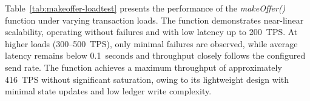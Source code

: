 \documentclass[12pt]{article}
\begin{document}
	\begin{table}[h]
		\centering
		\caption{Performance Results for \texttt{acceptOffer} (Payload: 35 bytes) under Varying Load}
		
		
		\label{tab:acceptoffer-loadtest}
	\end{table}
	
	
	Table~\ref{tab:makeoffer-loadtest} presents the performance of the \textit{makeOffer()} function under varying transaction loads. The function demonstrates near-linear scalability, operating without failures and with low latency up to 200~TPS. At higher loads (300--500~TPS), only minimal failures are observed, while average latency remains below 0.1~seconds and throughput closely follows the configured send rate. The function achieves a maximum throughput of approximately 416~TPS without significant saturation, owing to its lightweight design with minimal state updates and low ledger write complexity.
	
	
	
	
	
\end{document}
